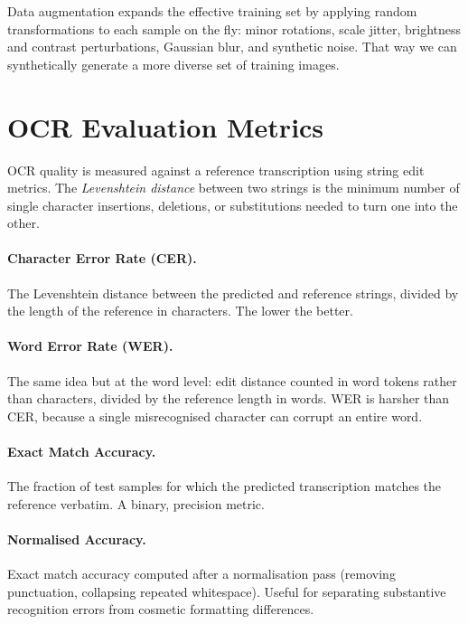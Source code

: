 Data augmentation expands the effective training set by applying random transformations to each sample on the fly: minor rotations, scale jitter, brightness and contrast perturbations, Gaussian blur, and synthetic noise. That way we can synthetically generate a more diverse set of training images.


\section{OCR Evaluation Metrics}
\label{sec:appendix-ocr-metrics}

OCR quality is measured against a reference transcription using string edit metrics. The \textit{Levenshtein distance} between two strings is the minimum number of single character insertions, deletions, or substitutions needed to turn one into the other.

\paragraph{Character Error Rate (CER).} The Levenshtein distance between the predicted and reference strings, divided by the length of the reference in characters. The lower the better.


\paragraph{Word Error Rate (WER).} The same idea but at the word level: edit distance counted in word tokens rather than characters, divided by the reference length in words. WER is harsher than CER, because a single misrecognised character can corrupt an entire word.

\paragraph{Exact Match Accuracy.} The fraction of test samples for which the predicted transcription matches the reference verbatim. A binary, precision metric.

\paragraph{Normalised Accuracy.} Exact match accuracy computed after a normalisation pass (removing punctuation, collapsing repeated whitespace). Useful for separating substantive recognition errors from cosmetic formatting differences.

